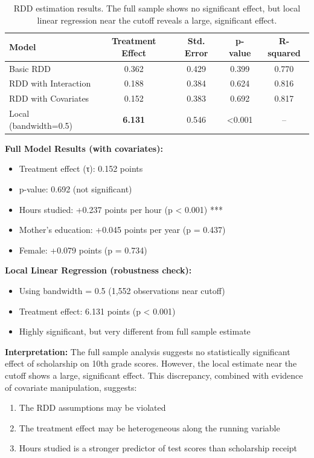 \documentclass[a4paper,12pt,headsepline]{scrartcl} %
\begin{document}
\begin{table}[H]
\centering
\begin{tabular}{lcccc}
\toprule
Model & Treatment Effect & Std. Error & p-value & R-squared \\
\midrule
Basic RDD & 0.362 & 0.429 & 0.399 & 0.770 \\
RDD with Interaction & 0.188 & 0.384 & 0.624 & 0.816 \\
RDD with Covariates & 0.152 & 0.383 & 0.692 & 0.817 \\
\midrule
Local (bandwidth=0.5) & \textbf{6.131} & 0.546 & <0.001 & -- \\
\bottomrule
\end{tabular}
\caption{RDD estimation results. The full sample shows no significant effect, but local linear regression near the cutoff reveals a large, significant effect.}
\label{tab:rdd_results}
\end{table}

\textbf{Full Model Results (with covariates):}
\begin{itemize}
    \item Treatment effect (τ): 0.152 points
    \item p-value: 0.692 (not significant)
    \item Hours studied: +0.237 points per hour (p < 0.001) ***
    \item Mother's education: +0.045 points per year (p = 0.437)
    \item Female: +0.079 points (p = 0.734)
\end{itemize}

\textbf{Local Linear Regression (robustness check):}
\begin{itemize}
    \item Using bandwidth = 0.5 (1,552 observations near cutoff)
    \item Treatment effect: 6.131 points (p < 0.001)
    \item Highly significant, but very different from full sample estimate
\end{itemize}

\textbf{Interpretation:}
The full sample analysis suggests no statistically significant effect of scholarship on 10th grade scores. However, the local estimate near the cutoff shows a large, significant effect. This discrepancy, combined with evidence of covariate manipulation, suggests:
\begin{enumerate}
    \item The RDD assumptions may be violated
    \item The treatment effect may be heterogeneous along the running variable
    \item Hours studied is a stronger predictor of test scores than scholarship receipt
\end{enumerate}
\end{document}
